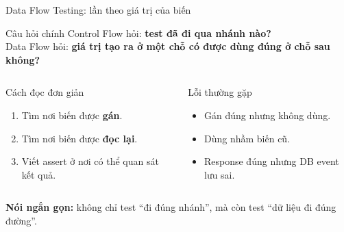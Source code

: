 \documentclass[aspectratio=169,12pt]{beamer}
\begin{document}
\begin{frame}[shrink=6]{Data Flow Testing: lần theo giá trị của biến}
  \begin{block}{Câu hỏi chính}
    Control Flow hỏi: \textbf{test đã đi qua nhánh nào?}\\
    Data Flow hỏi: \textbf{giá trị tạo ra ở một chỗ có được dùng đúng ở chỗ sau không?}
  \end{block}

  \vspace{0.2em}
  \begin{columns}[T]
    \begin{exampleblock}{Cách đọc đơn giản}
      \begin{enumerate}
        \item Tìm nơi biến được \textbf{gán}.
        \item Tìm nơi biến được \textbf{đọc lại}.
        \item Viết assert ở nơi có thể quan sát kết quả.
      \end{enumerate}
    \end{exampleblock}

    \begin{alertblock}{Lỗi thường gặp}
      \begin{itemize}
        \item Gán đúng nhưng không dùng.
        \item Dùng nhầm biến cũ.
        \item Response đúng nhưng DB event lưu sai.
      \end{itemize}
    \end{alertblock}
  \end{columns}

  \vspace{0.2em}
  \centering
  \large
  \textbf{Nói ngắn gọn:} không chỉ test ``đi đúng nhánh'', mà còn test
  ``dữ liệu đi đúng đường''.
\end{frame}
\end{document}
